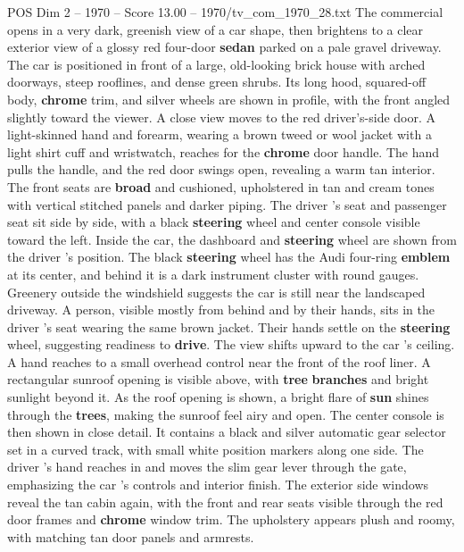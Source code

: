 \begin{textsample}{POS Dim 2 – 1970 – Score 13.00 – 1970/tv\_com\_1970\_28.txt}  \label{ex:f2_pos_076}
The commercial opens in a very dark, greenish view of a car shape, then brightens to a clear exterior view of a glossy red four-door \textbf{sedan} parked on a pale gravel driveway.
The car is positioned in front of a large, old-looking brick house with arched doorways, steep rooflines, and dense green shrubs.
Its long hood, squared-off body, \textbf{chrome} trim, and silver wheels are shown in profile, with the front angled slightly toward the viewer.
A close view moves to the red driver’s-side door.
A light-skinned hand and forearm, wearing a brown tweed or wool jacket with a light shirt cuff and wristwatch, reaches for the \textbf{chrome} door handle.
The hand pulls the handle, and the red door swings open, revealing a warm tan interior.
The front seats are \textbf{broad} and cushioned, upholstered in tan and cream tones with vertical stitched panels and darker piping.
The driver ’s seat and passenger seat sit side by side, with a black \textbf{steering} wheel and center console visible toward the left.
Inside the car, the dashboard and \textbf{steering} wheel are shown from the driver ’s position.
The black \textbf{steering} wheel has the Audi four-ring \textbf{emblem} at its center, and behind it is a dark instrument cluster with round gauges.
Greenery outside the windshield suggests the car is still near the landscaped driveway.
A person, visible mostly from behind and by their hands, sits in the driver ’s seat wearing the same brown jacket.
Their hands settle on the \textbf{steering} wheel, suggesting readiness to \textbf{drive}.
The view shifts upward to the car ’s ceiling.
A hand reaches to a small overhead control near the front of the roof liner.
A rectangular sunroof opening is visible above, with \textbf{tree} \textbf{branches} and bright sunlight beyond it.
As the roof opening is shown, a bright flare of \textbf{sun} shines through the \textbf{trees}, making the sunroof feel airy and open.
The center console is then shown in close detail.
It contains a black and silver automatic gear selector set in a curved track, with small white position markers along one side.
The driver ’s hand reaches in and moves the slim gear lever through the gate, emphasizing the car ’s controls and interior finish.
The exterior side windows reveal the tan cabin again, with the front and rear seats visible through the red door frames and \textbf{chrome} window trim.
The upholstery appears plush and roomy, with matching tan door panels and armrests.

\end{textsample}
